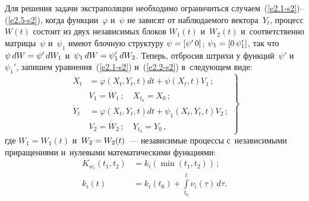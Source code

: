 \begin{multicols}{2}
Для решения задачи экстраполяции необходимо ограничиться случаем~(\ref{e2.1-s2})--(\ref{e2.5-s2}),
когда функции~$\varphi$ и~$\psi$ не зависят от наблюдаемого
вектора~$Y_t$, процесс $W(t)$ состоит из двух независимых блоков
$W_1 (t)$ и~$W_2(t)$ и~соответственно матрицы~$\psi$ и~$\psi_1$
имеют блочную структуру  $\psi\hm = \lk \psi'\, 0\rk$; $ \psi_1\hm = \lk
0\,\psi_1'\rk$, так что $\psi \,dW \hm= \psi' \,dW_1$ и~$\psi_1 \,dW\hm=
\psi_1'\, dW_2$. Теперь, отбросив штрихи у функций~$\psi'$ и~$\psi_1'$, 
запишем уравнения~(\ref{e2.1-s2}) и~(\ref{e2.2-s2}) в~следующем виде:
\begin{equation}
\left.
\begin{array}{rl}
    \dot X_t &= \varphi \left(X_t,Y_t,t\right) dt + \psi \left(X_t,t\right)V_1\,;\\[5pt]
    & V_1 = \dot W_1\,;\quad X_{t_0} = X_0\,;\\[5pt]
    \dot Y_t &= \varphi \left(X_t,Y_t,t\right) dt + \psi_1 \left(X_t,Y_t,t\right) V_2\,;\\[5pt]
    &V_2 =\dot W_2\,;\quad Y_{t_0} = Y_0\,,
    \end{array}
    \right\}
    \label{e7.1-s2}
\end{equation}
где $W_1 = W_1 (t)$ и~$W_2 \hm= W_2 (t)$~--- независимые процессы 
с~независимыми приращениями и~нулевыми математическими функциями:
\begin{align*}
    K_{w_i} (t_1, t_2)  &= k_i (\min (t_1, t_2))\,;\\ %
    k_i(t) &= \displaystyle k_i(t_0) + \int\limits_{t_0}^t \nu_i (\tau)
   \, d\tau.
    \end{align*}


\end{multicols}
